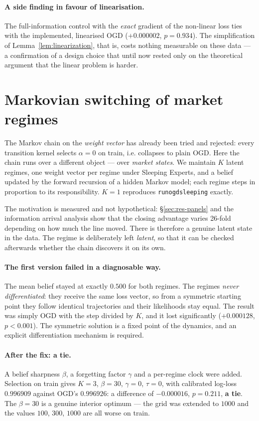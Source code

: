 \documentclass[12pt,a4paper,oneside]{report}
\newcommand{\file}[1]{\texttt{#1}}
\renewcommand{\_}{\oldunderscore\allowbreak}
\theoremstyle{definition}
\theoremstyle{plain}
\theoremstyle{remark}
\begin{document}
\paragraph{A side finding in favour of linearisation.} The full-information control with the
\emph{exact} gradient of the non-linear loss ties with the implemented, linearised OGD
($+0.000002$, $p=0.934$). The simplification of Lemma~\ref{lem:linearization}, that is, costs
nothing measurable on these data --- a confirmation of a design choice that until now rested only
on the theoretical argument that the linear problem is harder.

\section{Markovian switching of market regimes}
\label{sec:res-regime}

The Markov chain on the \emph{weight vector} has already been tried and rejected: every
transition kernel selects $\alpha=0$ on train, i.e. collapses to plain OGD. Here the chain runs
over a different object --- over \emph{market states}. We maintain $K$ latent regimes, one weight
vector per regime under Sleeping Experts, and a belief updated by the forward recursion of a
hidden Markov model; each regime steps in proportion to its responsibility. $K=1$ reproduces
\file{run\_ogd\_sleeping} exactly.

The motivation is measured and not hypothetical: \S\ref{sec:res-panels} and the information
arrival analysis show that the closing advantage varies 26-fold depending on how much the line
moved. There is therefore a genuine latent state in the data. The regime is deliberately left
\emph{latent}, so that it can be checked afterwards whether the chain discovers it on its own.

\paragraph{The first version failed in a diagnosable way.} The mean belief stayed at exactly
$0.500$ for both regimes. The regimes \emph{never differentiated}: they receive the same loss
vector, so from a symmetric starting point they follow identical trajectories and their
likelihoods stay equal. The result was simply OGD with the step divided by $K$, and it lost
significantly ($+0.000128$, $p<0.001$). The symmetric solution is a fixed point of the dynamics,
and an explicit differentiation mechanism is required.

\paragraph{After the fix: a tie.} A belief sharpness $\beta$, a forgetting factor $\gamma$ and a
per-regime clock were added. Selection on train gives $K=3$, $\beta=30$, $\gamma=0$, $\tau=0$,
with calibrated log-loss $0.996909$ against OGD's $0.996926$: a difference of $-0.000016$,
$p=0.211$, \textbf{a tie}. The $\beta=30$ is a genuine interior optimum --- the grid was extended
to $1000$ and the values $100$, $300$, $1000$ are all worse on train.
\end{document}
